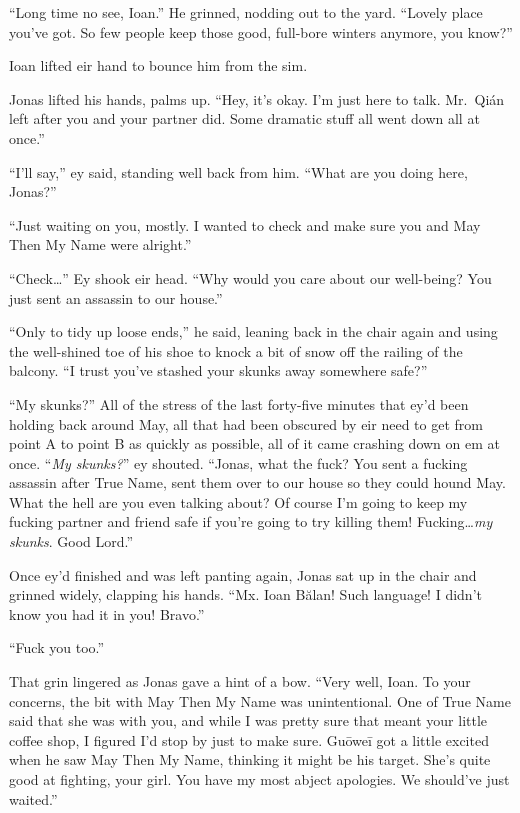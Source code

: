 ``Long time no see, Ioan.'' He grinned, nodding out to the yard. ``Lovely place you've got. So few people keep those good, full-bore winters anymore, you know?''

Ioan lifted eir hand to bounce him from the sim.

Jonas lifted his hands, palms up. ``Hey, it's okay. I'm just here to talk. Mr.~Qián left after you and your partner did. Some dramatic stuff all went down all at once.''

``I'll say,'' ey said, standing well back from him. ``What are you doing here, Jonas?''

``Just waiting on you, mostly. I wanted to check and make sure you and May Then My Name were alright.''

``Check\ldots{}'' Ey shook eir head. ``Why would you care about our well-being? You just sent an assassin to our house.''

``Only to tidy up loose ends,'' he said, leaning back in the chair again and using the well-shined toe of his shoe to knock a bit of snow off the railing of the balcony. ``I trust you've stashed your skunks away somewhere safe?''

``My skunks?'' All of the stress of the last forty-five minutes that ey'd been holding back around May, all that had been obscured by eir need to get from point A to point B as quickly as possible, all of it came crashing down on em at once. ``\emph{My skunks?}'' ey shouted. ``Jonas, what the fuck? You sent a fucking assassin after True Name, sent them over to our house so they could hound May. What the hell are you even talking about? Of course I'm going to keep my fucking partner and friend safe if you're going to try killing them! Fucking\ldots{}\emph{my skunks}. Good Lord.''

Once ey'd finished and was left panting again, Jonas sat up in the chair and grinned widely, clapping his hands. ``Mx. Ioan Bălan! Such language! I didn't know you had it in you! Bravo.''

``Fuck you too.''

That grin lingered as Jonas gave a hint of a bow. ``Very well, Ioan. To your concerns, the bit with May Then My Name was unintentional. One of True Name said that she was with you, and while I was pretty sure that meant your little coffee shop, I figured I'd stop by just to make sure. Guōweī got a little excited when he saw May Then My Name, thinking it might be his target. She's quite good at fighting, your girl. You have my most abject apologies. We should've just waited.''

